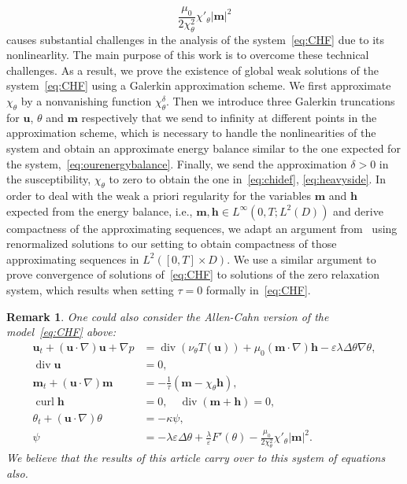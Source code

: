 \documentclass[10pt,letterpaper,twoside]{amsart}
\newtheorem{remark}[lemma]{Remark}
\theoremstyle{definition}{\newtheorem{definition}[lemma]{Definition}}
\theoremstyle{note}{\newtheorem{claim}{Claim}[section]
\newtheorem*{claim*}{Claim}}
\numberwithin{equation}{section}
\newcommand{\dom}{D}
\newcommand{\eps}{\varepsilon}
\newcommand{\Grad}{\nabla}
\newcommand{\Div}{\operatorname{div}}
\newcommand{\Curl}{\operatorname{curl}}
\newcommand{\bu}{\mathbf{u}}
\newcommand{\bm}{\mathbf{m}}
\newcommand{\bh}{\mathbf{h}}
\begin{document}
\begin{equation*}
	\frac{\mu_0}{2\chi_\theta^2}\chi'_\theta|\bm|^2
\end{equation*}
causes substantial challenges in the analysis of the system~\eqref{eq:CHF} due to its nonlinearlity. The main purpose of this work is to overcome these technical challenges. As a result, we prove the existence of global weak solutions of the system~\eqref{eq:CHF} using a Galerkin approximation scheme. We first approximate $\chi_\theta$ by a nonvanishing function $\chi_\theta^\delta$. Then we introduce three Galerkin truncations for $\bu$, $\theta$ and $\bm$ respectively that we send to infinity at different points in the approximation scheme, which is necessary to handle the nonlinearities of the system and obtain an approximate energy balance similar to the one expected for the system,~\eqref{eq:ourenergybalance}. Finally, we send the approximation $\delta>0$ in the susceptibility, $\chi_\theta$ to zero to obtain the one in~\eqref{eq:chidef}, \eqref{eq:heavyside}. In order to deal with the weak a priori regularity for the variables $\bm$ and $\bh$ expected from the energy balance, i.e., $\bm,\bh\in L^\infty(0,T;L^2(\dom))$ and derive compactness of the approximating sequences, we adapt an argument from~\cite{Nochetto2019} using renormalized solutions to our setting to obtain compactness of those approximating sequences in $L^2([0,T]\times\dom)$. We use a similar argument to prove convergence of solutions of~\eqref{eq:CHF} to solutions of the zero relaxation system, which results when setting $\tau=0$ formally in~\eqref{eq:CHF}.

\begin{remark}
	One could also consider the Allen-Cahn version of the model~\eqref{eq:CHF} above:
	\begin{subequations}\label{eq:ACF}
		\begin{align}
			\bu_t+(\bu\cdot\Grad)\bu+\Grad p&=\Div(\nu_\theta T(\bu))+\mu_0(\bm\cdot\Grad)\bh-\eps\lambda\Delta\theta\Grad\theta,\label{eq:nse2}\\
			\Div\bu&=0,\\
			\bm_t+(\bu\cdot\Grad)\bm&=-\frac{1}{\tau}(\bm-\chi_\theta\bh),\\
			\Curl\bh &=0,\quad \Div(\bm+\bh)=0,\label{eq:maxwell2}\\
			\theta_t+(\bu\cdot\Grad)\theta&=-\kappa\psi,\label{eq:phasefield2}\\
			\psi&= -\lambda\eps\Delta\theta+\frac{\lambda}{\eps}F'(\theta)-\frac{\mu_0}{2\chi_\theta^2}\chi'_\theta|\bm|^2.
		\end{align}
	\end{subequations}
	We believe that the results of this article carry over to this system of equations also.
\end{remark}
\end{document}
